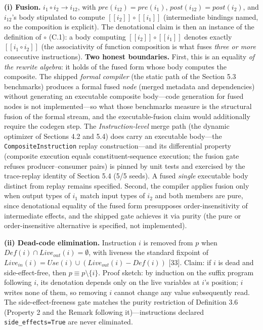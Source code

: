 \documentclass[
  11pt,
]{article}
\newcounter{none} %
\newcommand{\llbracket}{[\![}
\newcommand{\rrbracket}{]\!]}
\begin{document}
\textbf{(i) Fusion.} \(i_1 \circ i_2 \rightarrow i_{12}\), with
\(pre(i_{12}) = pre(i_1)\), \(post(i_{12}) = post(i_2)\), and
\(i_{12}\)'s body stipulated to compute
\(\llbracket i_2 \rrbracket \circ \llbracket i_1 \rrbracket\)
(intermediate bindings named, so the composition is explicit). The
denotational claim is then an instance of the definition of \(\circ\)
(C.1): a body computing
\(\llbracket i_2 \rrbracket \circ \llbracket i_1 \rrbracket\) denotes
exactly \(\llbracket i_1 \circ i_2 \rrbracket\) (the associativity of
function composition is what fuses \emph{three or more} consecutive
instructions). \textbf{Two honest boundaries.} First, this is an
equality \emph{of the rewrite algebra}: it holds of the fused form whose
body computes the composite. The shipped \emph{formal compiler} (the
static path of the Section 5.3 benchmarks) produces a formal fused
\emph{node} (merged metadata and dependencies) without generating an
executable composite body---code generation for fused nodes is not
implemented---so what those benchmarks measure is the structural fusion
of the formal stream, and the executable-fusion claim would additionally
require the codegen step. The \emph{Instruction-level} merge path (the
dynamic optimizer of Sections 4.2 and 5.4) does carry an executable
body---the \texttt{CompositeInstruction} replay construction---and its
differential property (composite execution equals constituent-sequence
execution; the fusion gate refuses producer--consumer pairs) is pinned
by unit tests and exercised by the trace-replay identity of Section 5.4
(5/5 seeds). A fused \emph{single} executable body distinct from replay
remains specified. Second, the compiler applies fusion only when output
types of \(i_1\) match input types of \(i_2\) and both members are pure,
since denotational equality of the fused form presupposes
order-insensitivity of intermediate effects, and the shipped gate
achieves it via purity (the pure or order-insensitive alternative is
specified, not implemented).

\textbf{(ii) Dead-code elimination.} Instruction \(i\) is removed from
\(p\) when \(Def(i) \cap Live_{out}(i) = \emptyset\), with liveness the
standard fixpoint of
\(Live_{in}(i) = Use(i) \cup (Live_{out}(i) - Def(i))\) {[}33{]}. Claim:
if \(i\) is dead and side-effect-free, then
\(p \equiv p \setminus \{i\}\). Proof sketch: by induction on the suffix
program following \(i\), its denotation depends only on the live
variables at \(i\)'s position; \(i\) writes none of them, so removing
\(i\) cannot change any value subsequently read. The
side-effect-freeness gate matches the purity restriction of Definition
3.6 (Property 2 and the Remark following it)---instructions declared
\texttt{side\_effects=True} are never eliminated.
\end{document}
